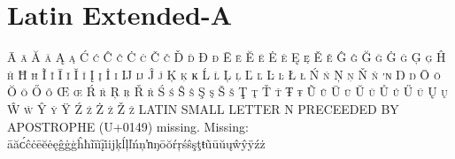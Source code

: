 

\presection\section*{\checkno Latin Extended-A}\postsection

\textsc{Ā ā Ă ă Ą ą Ć ć Ĉ ĉ Ċ ċ Č č Ď ď Đ đ Ē ē Ĕ ĕ Ė ė Ę ę 
Ě ě Ĝ ĝ Ğ ğ Ġ ġ Ģ ģ Ĥ ĥ Ħ ħ Ĩ ĩ Ī ī Ĭ ĭ Į į İ ı Ĳ ĳ Ĵ ĵ Ķ ķ 
ĸ Ĺ ĺ Ļ ļ Ľ ľ Ŀ ŀ Ł ł Ń ń Ņ ņ Ň ň ŉ Ŋ ŋ Ō ō Ŏ ŏ Ő ő Œ œ Ŕ ŕ 
Ŗ ŗ Ř ř Ś ś Ŝ ŝ Ş ş Š š Ţ ţ Ť ť Ŧ ŧ Ũ ũ Ū ū Ŭ ŭ Ů ů Ű ű Ų ų 
Ŵ ŵ Ŷ ŷ Ÿ Ź ź Ż ż Ž ž} LATIN SMALL LETTER N PRECEEDED BY APOSTROPHE (U+0149) missing.
\hfill Missing: āăᴄ́ĉċēĕėęĝġģĥħĩīĭįi̇ijķĺļľńņŉŋōŏŕŗśŝşţŧũūŭųŵŷÿźż